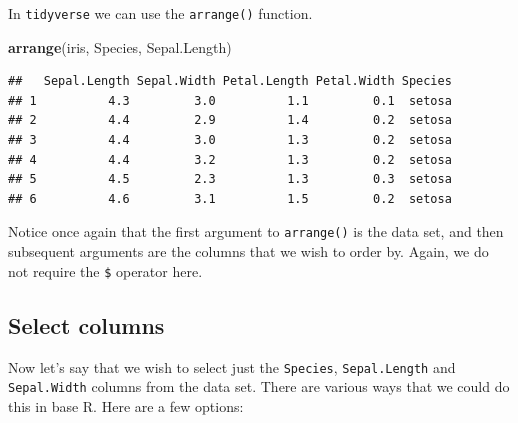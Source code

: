 \documentclass[]{book}
\newenvironment{Shaded}{\begin{snugshade}}{\end{snugshade}}
\newcommand{\KeywordTok}[1]{\textcolor[rgb]{0.13,0.29,0.53}{\textbf{{#1}}}}
\newcommand{\DataTypeTok}[1]{\textcolor[rgb]{0.13,0.29,0.53}{{#1}}}
\newcommand{\DecValTok}[1]{\textcolor[rgb]{0.00,0.00,0.81}{{#1}}}
\newcommand{\StringTok}[1]{\textcolor[rgb]{0.31,0.60,0.02}{{#1}}}
\newcommand{\NormalTok}[1]{{#1}}
\theoremstyle{definition}
\theoremstyle{definition}
\theoremstyle{definition}
\theoremstyle{remark}
\begin{document}
In \texttt{tidyverse} we can use the \texttt{arrange()} function.

\begin{Shaded}
\begin{Highlighting}[]
\KeywordTok{arrange}\NormalTok{(iris, Species, Sepal.Length)}
\end{Highlighting}
\end{Shaded}

\begin{verbatim}
##   Sepal.Length Sepal.Width Petal.Length Petal.Width Species
## 1          4.3         3.0          1.1         0.1  setosa
## 2          4.4         2.9          1.4         0.2  setosa
## 3          4.4         3.0          1.3         0.2  setosa
## 4          4.4         3.2          1.3         0.2  setosa
## 5          4.5         2.3          1.3         0.3  setosa
## 6          4.6         3.1          1.5         0.2  setosa
\end{verbatim}

Notice once again that the first argument to \texttt{arrange()} is the
data set, and then subsequent arguments are the columns that we wish to
order by. Again, we do not require the \texttt{\$} operator here.

\subsection{Select columns}\label{select-columns}

Now let's say that we wish to select just the \texttt{Species},
\texttt{Sepal.Length} and \texttt{Sepal.Width} columns from the data
set. There are various ways that we could do this in base R. Here are a
few options:

\begin{Shaded}
\end{Shaded}
\end{document}
